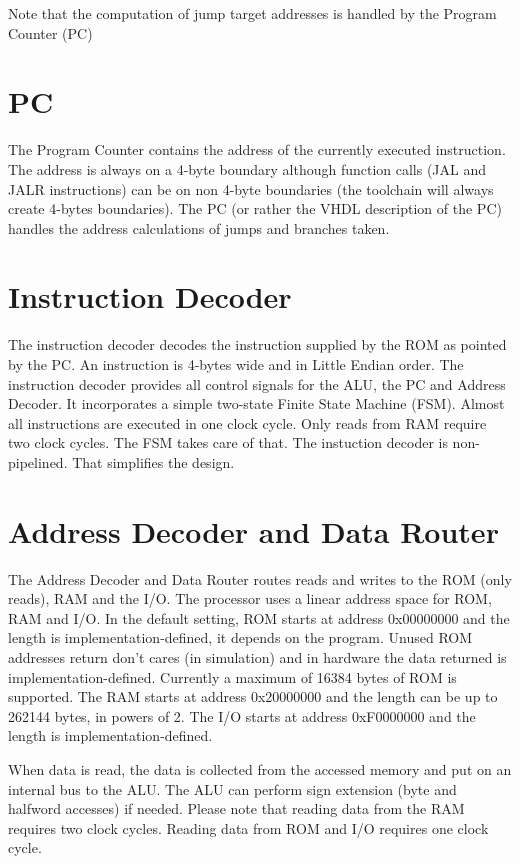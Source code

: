 \documentclass[12pt]{article}
\begin{document}
Note that the computation of jump target addresses is handled by the Program Counter (PC)

\section{PC}
\label{sec:pc}
The Program Counter contains the address of the currently executed instruction. The address is always on a 4-byte boundary although function calls (JAL and JALR instructions) can be on non 4-byte boundaries (the toolchain will always create 4-bytes boundaries). The PC (or rather the VHDL description of the PC) handles the address calculations of jumps and branches taken.

\section{Instruction Decoder}
\label{sec:instructiondecoder}
The instruction decoder decodes the instruction supplied by the ROM as pointed by the PC. An instruction is 4-bytes wide and in Little Endian order. The instruction decoder provides all control signals for the ALU, the PC and Address Decoder. It incorporates a simple two-state Finite State Machine (FSM). Almost all instructions are executed in one clock cycle. Only reads from RAM require two clock cycles. The FSM takes care of that. The instuction decoder is non-pipelined. That simplifies the design.

\section{Address Decoder and Data Router}
\label{sec:addressdecoderanddatarouter}
The Address Decoder and Data Router routes reads and writes to the ROM (only reads), RAM and the I/O. The processor uses a linear address space for ROM, RAM and I/O. In the default setting, ROM starts at address 0x00000000 and the length is implementation-defined, it depends on the program. Unused ROM addresses return don't cares (in simulation) and in hardware the data returned is implementation-defined. Currently a maximum of 16384 bytes of ROM is supported. The RAM starts at address 0x20000000 and the length can be up to 262144 bytes, in powers of 2. The I/O starts at address 0xF0000000 and the length is implementation-defined.

When data is read, the data is collected from the accessed memory and put on an internal bus to the ALU. The ALU can perform sign extension (byte and halfword accesses) if needed. Please note that reading data from the RAM requires two clock cycles. Reading data from ROM and I/O requires one clock cycle.
\end{document}
